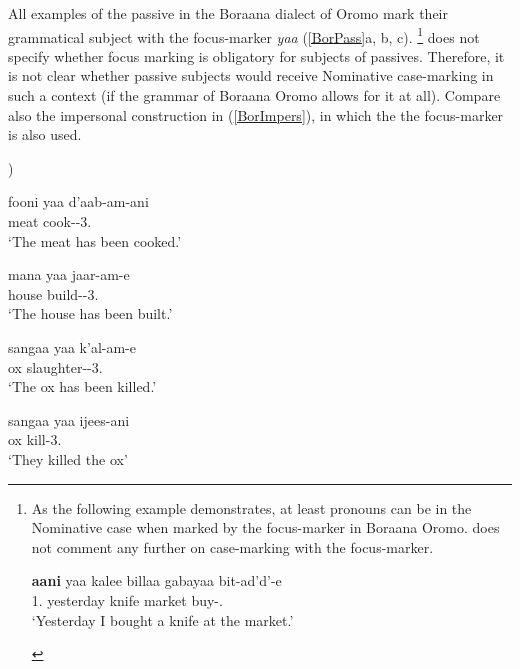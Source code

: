 All examples of the passive in the Boraana dialect of Oromo mark their grammatical subject with the focus-marker \emph{yaa} (\ref{BorPass}a, b, c).
\footnote{As the following example demonstrates, at least pronouns can be in the Nominative case when marked by the focus-marker in Boraana Oromo. 
\citet[74]{Stroomer:1995} does not comment any further on case-marking with the focus-marker.

\begin{exe}\ex\gll \textbf{aani} yaa kalee billaa gabayaa bit-ad'd'-e\\
1\sg{}.\nom{} \foc{} yesterday knife market buy-\sg{}.\pst{}\\
\glt `Yesterday I bought a knife at the market.'
\end{exe} } 
\citet{Stroomer:1995} does not specify whether focus marking is obligatory for subjects of passives. 
Therefore, it is not clear whether passive subjects would receive Nominative case-marking in such a context (if the grammar of Boraana Oromo allows for it at all).
Compare also the impersonal construction in (\ref{BorImpers}), in which the the focus-marker is also used. %

\begin{exe} \ex\label{BorPass}){}{\citealp[74, 89, 90]{Stroomer:1995}}
\begin{xlist}\ex\gll fooni yaa d'aab-am-ani\\
meat \foc{} cook-\pass{}-3\pl{}.\pst{}\\
\glt `The meat has been cooked.'

\ex\gll mana yaa jaar-am-e\\
house \foc{} build-\pass{}-3\sg{}.\pst{}\\
\glt `The house has been built.'

\ex\gll sangaa yaa k'al-am-e\\
ox \foc{} slaughter-\pass{}-3\sg{}.\pst{}\\
\glt `The ox has been killed.'

\ex\label{BorImpers}\gll sangaa yaa ijees-ani\\
ox \foc{} kill-3\pl{}.\pst{}\\
\glt `They killed the ox' %

\end{xlist} 
\end{exe}  



